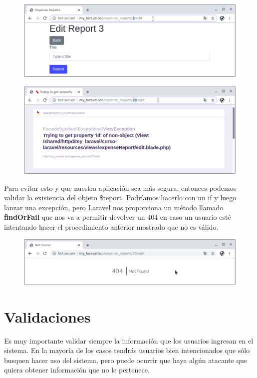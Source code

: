 \documentclass{article}
\begin{document}
\begin{figure}[h!]
  \centering
  \includegraphics[scale=0.5]{./Pictures/083_edit_url_id.png}
\end{figure}

\begin{figure}[h!]
  \centering
  \includegraphics[scale=0.5]{./Pictures/084_edit_url_id_error.png}
\end{figure}

Para evitar esto y que nuestra aplicación sea más segura, entonces podemos
validar la existencia del objeto \$report. Podríamos hacerlo con un if y luego
lanzar una excepción, pero Laravel nos proporciona un método llamado
\textbf{findOrFail} que nos va a permitir devolver un 404 en caso un usuario
esté intentando hacer el procedimiento anterior mostrado que no es válido.\\

\begin{figure}[h!]
  \centering
  \includegraphics[scale=0.5]{./Pictures/085_404_fidOrFail.png}
\end{figure}

\newpage


\section{Validaciones}%
Es muy importante validar siempre la información que los usuarios ingresan en
el sistema. En la mayoría de los casos tendrás usuarios bien intencionados que
sólo busquen hacer uso del sistema, pero puede ocurrir que haya algún atacante
que quiera obtener información que no le pertenece.\\
\end{document}
